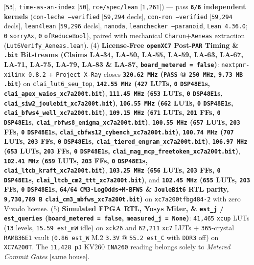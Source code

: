 \documentclass[10pt]{article}
\begin{document}
{{[\texttt{53}], \texttt{time-as-an-index} [\texttt{50}], \texttt{rce/spec/lean} [\texttt{1,261}]) --- pass \textbf{\texttt{6/6} independent kernels} (\texttt{con-leche --verified} [\texttt{59,294} decls], \texttt{con-ron --verified} [\texttt{59,294} decls], \texttt{lean4lean} [\texttt{59,296} decls], \texttt{nanoda}, \texttt{leanchecker --paranoid}, \texttt{Lean 4.36.0}; \texttt{0} \texttt{sorryAx}, \texttt{0} \texttt{ofReduceBool}), paired with mechanical \texttt{Charon}+\texttt{Aeneas} extraction (\texttt{Lut6Verify\_Aeneas.lean}). (4) \textbf{License-Free \texttt{openXC7} Post-\texttt{PAR} Timing \& \texttt{.bit} Bitstreams (Claims LA-34, LA-50, LA-55, LA-59, LA-63, LA-67, LA-71, LA-75, LA-79, LA-83 \& LA-87, \texttt{board\_metered = false})}: \texttt{nextpnr-xilinx 0.8.2} + \texttt{Project X-Ray} closes \textbf{\texttt{320.62 MHz} (\texttt{PASS} @ \texttt{250 MHz}, \texttt{9.73 MB} \texttt{.bit})} on \texttt{clai\_lut6\_seu\_top}, \textbf{\texttt{142.55 MHz} (\texttt{427} LUTs, \texttt{0} \texttt{DSP48E1}s, \texttt{clai\_apex\_waios\_xc7a200t.bit})}, \textbf{\texttt{111.45 MHz} (\texttt{653} LUTs, \texttt{0} \texttt{DSP48E1}s, \texttt{clai\_siw2\_joulebit\_xc7a200t.bit})}, \textbf{\texttt{106.55 MHz} (\texttt{662} LUTs, \texttt{0} \texttt{DSP48E1}s, \texttt{clai\_bfws4\_well\_xc7a200t.bit})}, \textbf{\texttt{109.15 MHz} (\texttt{671} LUTs, \texttt{201} FFs, \texttt{0} \texttt{DSP48E1}s, \texttt{clai\_rbfws8\_enigma\_xc7a200t.bit})}, \textbf{\texttt{100.55 MHz} (\texttt{657} LUTs, \texttt{203} FFs, \texttt{0} \texttt{DSP48E1}s, \texttt{clai\_cbfws12\_cybench\_xc7a200t.bit})}, \textbf{\texttt{100.74 MHz} (\texttt{707} LUTs, \texttt{203} FFs, \texttt{0} \texttt{DSP48E1}s, \texttt{clai\_tiered\_engram\_xc7a200t.bit})}, \textbf{\texttt{106.97 MHz} (\texttt{653} LUTs, \texttt{203} FFs, \texttt{0} \texttt{DSP48E1}s, \texttt{clai\_mag\_mcp\_freetoken\_xc7a200t.bit})}, \textbf{\texttt{102.41 MHz} (\texttt{659} LUTs, \texttt{203} FFs, \texttt{0} \texttt{DSP48E1}s, \texttt{clai\_ltcb\_kraft\_xc7a200t.bit})}, \textbf{\texttt{103.25 MHz} (\texttt{656} LUTs, \texttt{203} FFs, \texttt{0} \texttt{DSP48E1}s, \texttt{clai\_ltcb\_cm2\_ttt\_xc7a200t.bit})}, and \textbf{\texttt{102.45 MHz} (\texttt{655} LUTs, \texttt{203} FFs, \texttt{0} \texttt{DSP48E1}s, \texttt{64/64} \texttt{CM3-LogOdds+M-BFWS} \& \texttt{JouleBit6} RTL parity, \texttt{9,730,769 B} \texttt{clai\_cm3\_mbfws\_xc7a200t.bit})} on \texttt{xc7a200tfbg484-2} with zero Vivado license. (5) \textbf{Simulated FPGA RTL, Yosys Miter, \& \texttt{est\_j} / \texttt{est\_queries} (\texttt{board\_metered = false}, \texttt{measured\_j = None})}: \texttt{41,465} \texttt{xcup} LUTs (\texttt{13} levels, \texttt{15.59 est\_mW} idle) on \texttt{xck26} and \texttt{62,211} \texttt{xc7} LUTs + \texttt{365}-crystal \texttt{RAMB36E1} vault (\texttt{0.86 est\_W} M.2 \texttt{3.3V} @ \texttt{55.2 est\_C} with \texttt{DDR3} off) on \texttt{XC7A200T}. The \texttt{11,428 pJ} KV260 \texttt{INA260} reading belongs solely to \emph{Metered Commit Gates} [same house].
  }%
}
\end{document}
